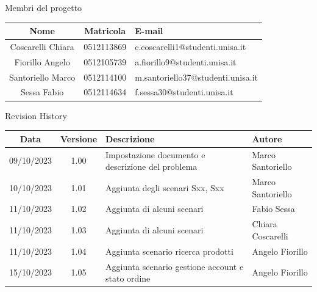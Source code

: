 \documentclass[12pt, a4paper, oneside]{book}
\begin{document}
    \newpage
    \begin{center}
    {\LARGE{Membri del progetto}}
    \end{center}
    \begin{center}
        \begin{tabular}{|c|c|m{8cm}|}
            \hline
            \cellcolor{lightgray} \textbf{Nome} & \cellcolor{lightgray} \textbf{Matricola} & \cellcolor{lightgray} \textbf{E-mail}\\ \hline
            Coscarelli  Chiara & 0512113869 & c.coscarelli1@studenti.unisa.it\\ \hline
            Fiorillo Angelo & 0512105739 & a.fiorillo9@studenti.unisa.it\\ \hline
            Santoriello Marco &  0512114100 & m.santoriello37@studenti.unisa.it\\ \hline
            Sessa Fabio & 0512114634 & f.sessa30@studenti.unisa.it\\ \hline
        \end{tabular}
    \end{center}

    \begin{center}
    {\LARGE{Revision History}}
    \end{center}

    \begin{center}
        \begin{tabular}{|c|c|m{8cm}|m{3.5cm}|}
            \hline
            \cellcolor{lightgray} \textbf{Data} & \cellcolor{lightgray} \textbf{Versione} & \cellcolor{lightgray} \textbf{Descrizione} & \cellcolor{lightgray} \textbf{Autore}\\ \hline
            09/10/2023 & 1.00 & Impostazione documento e descrizione del problema & Marco Santoriello\\ \hline
            10/10/2023 & 1.01 & Aggiunta degli scenari Sxx, Sxx & Marco Santoriello\\ \hline
            11/10/2023 & 1.02 & Aggiunta di alcuni scenari & Fabio Sessa\\ \hline
            11/10/2023 & 1.03 & Aggiunta di alcuni scenari & Chiara Coscarelli\\ \hline
            11/10/2023 & 1.04 & Aggiunta scenario ricerca prodotti & Angelo Fiorillo\\ \hline
            15/10/2023 & 1.05 & Aggiunta scenario gestione account e stato ordine & Angelo Fiorillo\\ \hline
        \end{tabular}
    \end{center}
\end{document}
